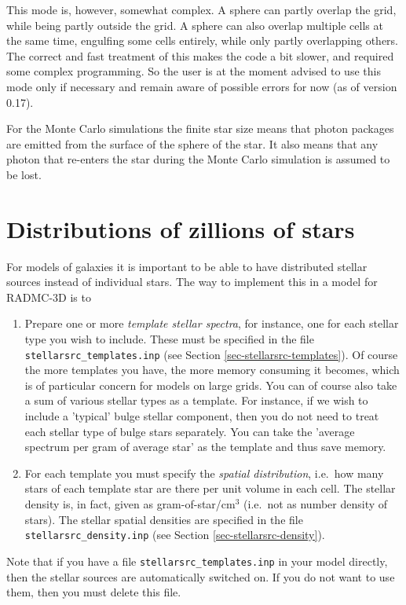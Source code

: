 \documentclass{report}
\begin{document}
This mode is, however, somewhat complex. A sphere can partly overlap the
grid, while being partly outside the grid. A sphere can also overlap
multiple cells at the same time, engulfing some cells entirely, while only
partly overlapping others. The correct and fast treatment of this makes
the code a bit slower, and required some complex programming. So the user
is at the moment advised to use this mode only if necessary and remain
aware of possible errors for now (as of version 0.17). 

For the Monte Carlo simulations the finite star size means that photon
packages are emitted from the surface of the sphere of the star. It also
means that any photon that re-enters the star during the Monte Carlo
simulation is assumed to be lost.



\section{Distributions of zillions of stars}
\label{sec-distrib-of-stars}
%
For models of galaxies it is important to be able to have distributed
stellar sources instead of individual stars. The way to implement this
in a model for RADMC-3D is to 
\begin{enumerate}
\item Prepare one or more {\em template stellar spectra}, for instance, one
  for each stellar type you wish to include. These must be specified in the
  file {\small\tt stellarsrc\_templates.inp} (see Section
  \ref{sec-stellarsrc-templates}). Of course the more templates you have,
  the more memory consuming it becomes, which is of particular concern for
  models on large grids. You can of course also take a sum of various
  stellar types as a template. For instance, if we wish to include a 
  'typical' bulge stellar component, then you do not need to treat each
  stellar type of bulge stars separately. You can take the 'average spectrum
  per gram of average star' as the template and thus save memory.
\item For each template you must specify the {\em spatial distribution},
  i.e.\ how many stars of each template star are there per unit volume in
  each cell. The stellar density is, in fact, given as gram-of-star/cm$^3$
  (i.e.\ not as number density of stars). The stellar spatial densities
  are specified in the file {\small\tt stellarsrc\_density.inp} (see
  Section \ref{sec-stellarsrc-density}).
\end{enumerate}
Note that if you have a file {\small\tt stellarsrc\_templates.inp} in your
model directly, then the stellar sources are automatically switched on.
If you do not want to use them, then you must delete this file. 
\end{document}
